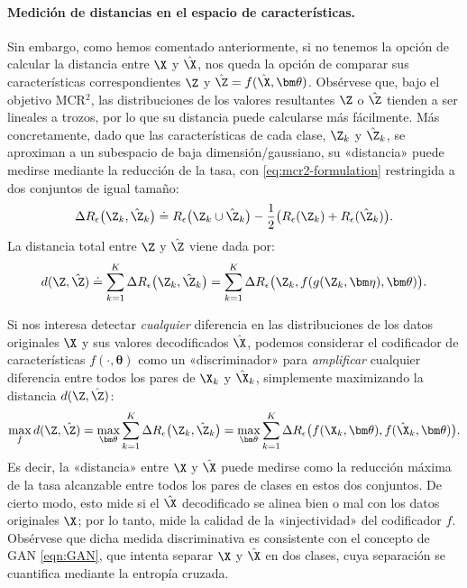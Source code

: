 \documentclass[../../book-main_es.tex]{subfiles}
\begin{document}
\paragraph{Medición de distancias en el espacio de características.}
Sin embargo, como hemos comentado anteriormente, si no tenemos la opción de
calcular la distancia entre $\X$ y $\hat \X$, nos queda la
opción de comparar sus características correspondientes $\Z$ y $\hat \Z =
f(\hat \X, \bm \theta)$. Obsérvese que, bajo el objetivo MCR$^2$, las
distribuciones de los valores resultantes $\Z$ o $\hat \Z$ tienden a ser lineales a trozos,
por lo que su distancia puede calcularse más fácilmente. Más concretamente,
dado que las características de cada clase, $\Z_k$ y $\hat{\Z}_k$, se aproximan
a un subespacio de baja dimensión/gaussiano, su «distancia» puede
medirse mediante la reducción de la tasa, con \eqref{eq:mcr2-formulation}
restringida a dos conjuntos de igual tamaño:
\begin{equation}
    \Delta R_\epsilon\big(\Z_k, \hat{\Z}_k\big) \doteq
    R_\epsilon\big(\Z_k \cup \hat{\Z}_k\big) - \frac{1}{2} \big(
    R_\epsilon(\Z_k) + R_\epsilon(\hat \Z_k)\big).
\end{equation}
La distancia total entre $\Z$ y $\hat \Z$ viene dada por:
\begin{equation}
    d(\Z, \hat \Z) \doteq   \sum_{k=1}^K \Delta R_\epsilon\big(\Z_k,
    \hat{\Z}_k\big) =  \sum_{k=1}^K \Delta R_\epsilon\big(\Z_k,
    f(g(\Z_k, \bm\eta),\bm \theta)\big).
    \label{eqn:Z-distance}
\end{equation}

Si nos interesa detectar {\em cualquier} diferencia en las
distribuciones de los datos originales $\X$ y sus valores decodificados $\hat \X$,
podemos considerar el codificador de características $f(\cdot, \bm \theta)$ como un
«discriminador» para {\em amplificar} cualquier diferencia entre todos los pares
de $\X_k$ y $\hat \X_k$, simplemente maximizando la distancia $d(\Z, \hat \Z)$:
\begin{equation}
    \max_f d(\Z, \hat \Z) = \max_{\bm \theta} \sum_{k=1}^K \Delta
    R_\epsilon\big(\Z_k, \hat{\Z}_k\big) = \max_{\bm \theta}
    \sum_{k=1}^K \Delta R_\epsilon\big(f(\X_k,\bm \theta),
    f(\hat{\X}_k,\bm \theta)\big).
    \label{eqn:max-distance}
\end{equation}
Es decir, la «distancia» entre $\X$ y $\hat \X$ puede medirse como
la reducción máxima de la tasa alcanzable entre todos los pares de clases
en estos dos conjuntos. De cierto modo, esto mide si
el $\hat \X$ decodificado se alinea bien o mal con los datos originales $\X$; por lo tanto,
mide la calidad de la «injectividad» del codificador $f$. Obsérvese
que dicha medida discriminativa es consistente con el concepto de GAN
\eqref{eqn:GAN}, que intenta separar $\X$ y $\hat \X$ en dos
clases, cuya separación se cuantifica mediante la entropía cruzada.
\end{document}
